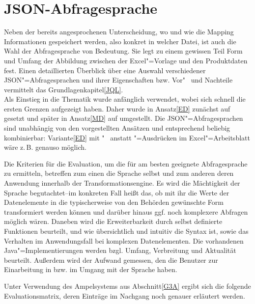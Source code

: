 \section{JSON-Abfragesprache}\label{JAS}

Neben der bereits angesprochenen Unterscheidung, wo und wie die Mapping Informationen gespeichert werden, also konkret in welcher Datei, ist auch die Wahl der Abfragesprache von Bedeutung. Sie legt zu einem gewissen Teil Form und Umfang der Abbildung zwischen der Excel"=Vorlage und den Produktdaten fest. Einen detaillierten Überblick über eine Auswahl verschiedener JSON"=Abfragesprachen und ihrer Eigenschaften bzw. Vor"~ und Nachteile vermittelt das Grundlagenkapitel\nbs\ref{JQL}. \\
Als Einstieg in die Thematik wurde anfänglich  verwendet, wobei sich schnell die ersten Grenzen aufgezeigt haben. Daher wurde in Ansatz\nbs\ref{ED} zunächst auf  gesetzt und später in Ansatz\nbs\ref{MD} auf  umgestellt. Die JSON"=Abfragesprachen sind unabhängig von den vorgestellten Ansätzen und entsprechend beliebig kombinierbar: Variante\nbs\ref{ED} mit "~ anstatt "=Ausdrücken im Excel"=Arbeitsblatt wäre z.\,B. genauso möglich.

Die Kriterien für die Evaluation, um die für  am besten geeignete Abfragesprache zu ermitteln, betreffen zum einen die Sprache selbst und zum anderen deren Anwendung innerhalb der Transformationsengine. 
Es wird die Mächtigkeit der Sprache begutachtet\nbs --\nbs im konkreten Fall heißt das, ob mit ihr die Werte der Datenelemente in die typischerweise von den Behörden gewünschte Form transformiert werden können und darüber hinaus ggf. noch komplexere Abfragen möglich wären. Daneben wird die Erweiterbarkeit durch selbst definierte Funktionen beurteilt, und wie übersichtlich und intuitiv die Syntax ist, sowie das Verhalten im Anwendungsfall bei komplexen Datenelementen. Die vorhandenen Java"=Implementierungen werden bzgl. Umfang, Verbreitung und Aktualität beurteilt. Außerdem wird der Aufwand gemessen, den die Benutzer zur Einarbeitung in bzw. im Umgang mit der Sprache haben.

\enlargethispage{\baselineskip}
Unter Verwendung des Ampelsystems aus Abschnitt\nbs\ref{G3A} ergibt sich die folgende Evaluationsmatrix, deren Einträge im Nachgang noch genauer erläutert werden.

